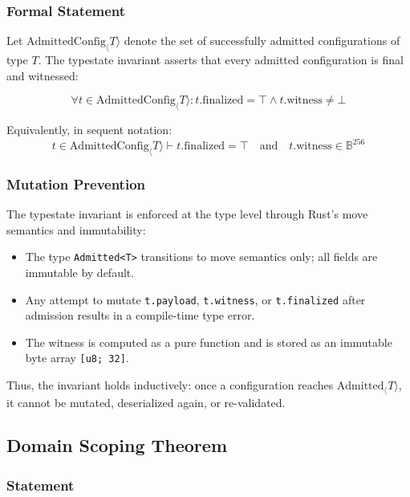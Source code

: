 \documentclass[11pt]{article}
\begin{document}
\subsubsection{Formal Statement}

Let $\text{AdmittedConfig}_\langle T \rangle$ denote the set of successfully admitted configurations of type $T$. The typestate invariant asserts that every admitted configuration is final and witnessed:

\begin{equation}
\forall t \in \text{AdmittedConfig}_\langle T \rangle : t.\text{finalized} = \top \land t.\text{witness} \neq \bot
\end{equation}

\noindent Equivalently, in sequent notation:
\begin{equation}
t \in \text{AdmittedConfig}_\langle T \rangle \vdash t.\text{finalized} = \top \quad \text{and} \quad t.\text{witness} \in \mathbb{B}^{256}
\end{equation}

\subsubsection{Mutation Prevention}

The typestate invariant is enforced at the type level through Rust's move semantics and immutability:

\begin{itemize}
  \item The type \texttt{Admitted<T>} transitions to move semantics only; all fields are immutable by default.
  \item Any attempt to mutate \texttt{t.payload}, \texttt{t.witness}, or \texttt{t.finalized} after admission results in a compile-time type error.
  \item The witness is computed as a pure function and is stored as an immutable byte array \texttt{[u8; 32]}.
\end{itemize}

\noindent Thus, the invariant holds inductively: once a configuration reaches $\text{Admitted}_\langle T \rangle$, it cannot be mutated, deserialized again, or re-validated.

\subsection{Domain Scoping Theorem}

\subsubsection{Statement}
\end{document}
